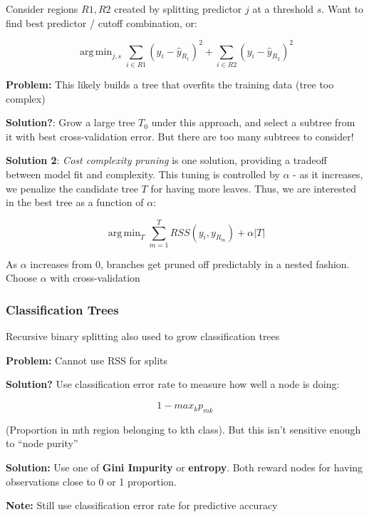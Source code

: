 \documentclass{article}
\DeclareMathOperator*{\argmin}{arg\,min}
\begin{document}
Consider regions $R1, R2$ created by splitting predictor $j$ at a threshold $s$. Want to find best predictor / cutoff combination, or:

\begin{equation*}
	\argmin_{j, s} \sum_{i \in R1} (y_i - \hat{y}_{R_1})^2 + \sum_{i \in R2} (y_i - \hat{y}_{R_2})^2
\end{equation*}

\textbf{Problem:} This likely builds a tree that overfits the training data (tree too complex)

\textbf{Solution?}: Grow a large tree $T_0$ under this approach, and select a subtree from it with best cross-validation error. But there are too many subtrees to consider!

\textbf{Solution 2}: \textit{Cost complexity pruning} is one solution, providing a tradeoff between model fit and complexity. This tuning is controlled by $\alpha$ - as it increases, we penalize the candidate tree $T$ for having more leaves. Thus, we are interested in the best tree as a function of $\alpha$:

\begin{equation*}
	\argmin_T \sum_{m=1}^T RSS(y_i, y_{R_m}) + \alpha |T|
\end{equation*}

As $\alpha$ increases from 0, branches get pruned off predictably in a nested fashion. Choose $\alpha$ with cross-validation

\subsubsection{Classification Trees}

Recursive binary splitting also used to grow classification trees

\textbf{Problem:} Cannot use RSS for splits

\textbf{Solution?} Use classification error rate to measure how well a node is doing:

\begin{equation*}
	1 - max_k p_{mk}
\end{equation*}

(Proportion in mth region belonging to kth class). But this isn't sensitive enough to ``node purity''

\textbf{Solution:} Use one of \textbf{Gini Impurity} or \textbf{entropy}. Both reward nodes for having observations close to 0 or 1 proportion.

\textbf{Note:} Still use classification error rate for predictive accuracy
\end{document}
